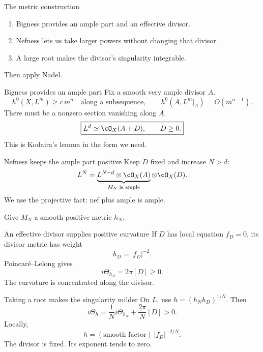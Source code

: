 \begin{frame}{The metric construction}
\begin{enumerate}
\setlength{\itemsep}{15pt}
\item Bigness provides an ample part and an effective divisor.
\item Nefness lets us take larger powers without changing that divisor.
\item A large root makes the divisor's singularity integrable.
\end{enumerate}
\par\bigskip
Then apply Nadel.
\end{frame}

\begin{frame}{Bigness provides an ample part}
Fix a smooth very ample divisor \(A\).
\[
h^0(X,L^m)\ge c\,m^n
\quad\text{along a subsequence},\qquad
h^0(A,L^m|_A)=O(m^{n-1}).
\]
There must be a nonzero section vanishing along \(A\).
\[
\boxed{L^d\simeq\cO_X(A+D),\qquad D\ge0.}
\]
This is Kodaira's lemma in the form we need.
\end{frame}

\begin{frame}{Nefness keeps the ample part positive}
Keep \(D\) fixed and increase \(N>d\):
\[
L^N=
\underbrace{L^{N-d}\otimes\cO_X(A)}_{M_N\text{ is ample}}
\otimes\cO_X(D).
\]
We use the projective fact: nef plus ample is ample.
\par\bigskip
\par Give \(M_N\) a smooth positive metric \(h_N\).
\end{frame}

\begin{frame}{An effective divisor supplies positive curvature}
If \(D\) has local equation \(f_D=0\), its divisor metric has weight
\[
h_D=|f_D|^{-2}.
\]
Poincaré--Lelong gives
\[
\boxed{i\Theta_{h_D}=2\pi[D]\ge0.}
\]
The curvature is concentrated along the divisor.
\end{frame}

\begin{frame}{Taking a root makes the singularity milder}
On \(L\), use \(h=(h_Nh_D)^{1/N}\).
Then
\[
i\Theta_h=\frac1N i\Theta_{h_N}+\frac{2\pi}{N}[D]>0.
\]
Locally,
\[
h=(\text{smooth factor})\,|f_D|^{-2/N}.
\]
The divisor is fixed. Its exponent tends to zero.
\end{frame}

